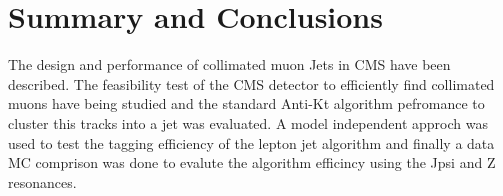 \section{Summary and Conclusions}
  The design and performance of collimated muon Jets in CMS have  been described.   The feasibility test of the 
CMS detector to efficiently find collimated muons have being studied and the standard Anti-Kt algorithm pefromance to cluster this tracks into a jet was evaluated.  A model independent approch was used to test the tagging efficiency of the lepton jet algorithm and finally a data MC comprison was done to evalute the algorithm efficincy using the Jpsi and Z resonances.

  
  

